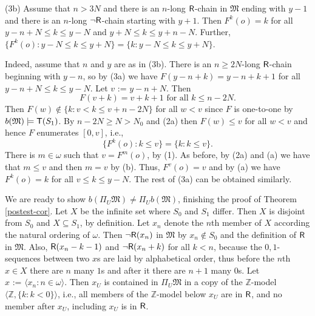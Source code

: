\documentclass[12pt,leqno]{article}
\newcommand{\de}{\mbox{\ :=\ }}
\newcommand{\Mm}{\mbox{$\mathfrak M$}}
\newcommand{\T}{\mbox{\sf T}}
\newcommand{\R}{\mbox{\sf R}}
\newcommand{\Z}{\mathbb Z}
\begin{document}
\begin{description}\label{3b}
	\item{(3b)} Assume that $n>3N$ and there is an $n$-long $\R$-chain in $\Mm$ ending with $y-1$ and there is an $n$-long $\lnot\R$-chain starting with $y+1$. Then $F^k(o)=k$ for all $y-n+N\le k\le y-N$ and $y+N\le k\le y+n-N$. Further, $\{ F^k(o) : y-N\le k\le y+N\}=\{ k : y-N\le k\le y+N\}$.
\end{description} 
%
\noindent Indeed, assume that $n$ and $y$ are as in (3b).  There is an $n\ge 2N$-long $\R$-chain beginning with $y-n$, so by (3a) we have $F(y-n+k)=y-n+k+1$ for all $y-n+N\le k\le y-N$. Let $v\de y-n+N$.  Then
\[ \tag{a} \mbox{$F(v+k)=v+k+1$ for all $k\le n-2N$.}\]
 Then $F(w)\notin\{ k : v< k \le v+n-2N\}$ for all $w<v$ since $F$ is one-to-one by $b(\Mm)\models\T(S_1)$. By $n-2N\ge N>N_0$ and (2a) then $F(w) \le v$ for all $w<v$ and hence $F$ enumerates $[0,v]$, i.e., 
 \[ \tag{b} \mbox{$\{ F^k(o) : k\le v\}=\{ k : k\le v\}$.}\]
  There is $m\in\omega$ such that $v=F^m(o)$, by (1). As before, by (2a) and (a) we have that $m\le v$  and then $m=v$  by (b). Thus, $F^{v}(o)=v$ and by (a) we have $F^k(o)=k$ for all $v\le k\le y-N$. The rest of (3a) can be obtained similarly.
\bigskip

We are ready to show $b(\Pi_U\Mm)\ne\Pi_Ub(\Mm)$, finishing the proof of Theorem \ref{postest-cor}. Let $X$ be the infinite set where $S_0$ and $S_1$ differ. Then $X$ is disjoint from $S_0$ and $X\subseteq S_1$, by definition.  Let  $x_n$ denote the $n$th member of $X$ according the natural ordering of $\omega$.  Then $\lnot\R(x_n)$ in $\Mm$ by $x_n\notin S_0$ and the definition of $\R$ in $\Mm$. Also, $\R(x_n-k-1)$ and $\lnot\R(x_n+k)$ for all $k<n$, because the $0,1$-sequences between two $x$s are laid by alphabetical order, thus before the $n$th  $x\in X$ there are $n$ many $1$s and after it there are $n+1$ many $0$s. Let $x\de\langle x_n : n\in\omega\rangle$. Then $x_U$ is contained in $\Pi_U\Mm$ in a copy of the $\Z$-model $\langle \Z,\{k : k<0\}\rangle$, i.e., all members of the $\Z$-model below $x_U$ are in $\R$, and no member after $x_U$, including $x_U$ is in $\R$. %
\end{document}
